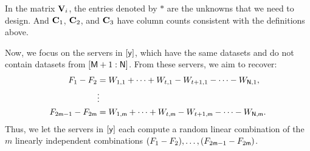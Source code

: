 \documentclass[conference,letterpaper]{IEEEtran}
\begin{document}
In the matrix ${\bf V}_i$, the entries denoted by $*$ are the unknowns that we need to design. And ${\bf C}_1$, ${\bf C}_2$, and ${\bf C}_3$ have column counts consistent with the definitions above.

Now, we focus on the servers in $[{\sf y}]$, which have the same datasets and do not contain datasets from $[{\sf M}+1 : {\sf N}]$. From these servers, we aim to recover:
\begin{align*}
    F_1 - F_2 &= W_{1,1} + \cdots + W_{t,1} - W_{t+1,1} - \cdots - W_{{\sf N},1}, \\
    &\vdots \\
    F_{2{\sf m} - 1} - F_{2{\sf m}} &= W_{1,{\sf m}} + \cdots + W_{t,{\sf m}} - W_{t+1,{\sf m}} - \cdots - W_{{\sf N},{\sf m}}.
\end{align*}
Thus, we let the servers in $[{\sf y}]$ each compute a random linear combination of the $m$ linearly independent combinations $(F_1 - F_2), \ldots, (F_{2{\sf m} - 1} - F_{2{\sf m}})$.
\end{document}
